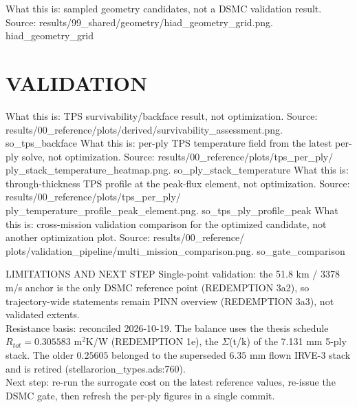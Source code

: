 \documentclass[aspectratio=169,11pt]{beamer}
\begin{document}
  {%
   What this is: sampled geometry candidates, not a DSMC validation result.
   Source: results/99\_shared/geometry/hiad\_geometry\_grid.png.}
  {hiad_geometry_grid}

\section{VALIDATION}
  {%
   What this is: TPS survivability/backface result, not optimization.
   Source: results/00\_reference/plots/derived/survivability\_assessment.png.}
  {so_tps_backface}
  {%
   What this is: per-ply TPS temperature field from the latest per-ply solve,
   not optimization. Source: results/00\_reference/plots/tps\_per\_ply/
   ply\_stack\_temperature\_heatmap.png.}
  {so_ply_stack_temperature}
  {%
   What this is: through-thickness TPS profile at the peak-flux element, not
   optimization. Source: results/00\_reference/plots/tps\_per\_ply/
   ply\_temperature\_profile\_peak\_element.png.}
  {so_tps_ply_profile_peak}
  {%
   What this is: cross-mission validation comparison for the optimized
   candidate, not another optimization plot. Source: results/00\_reference/
   plots/validation\_pipeline/multi\_mission\_comparison.png.}
  {so_gate_comparison}
\begin{frame}{LIMITATIONS AND NEXT STEP}
  \footnotesize
  Single-point validation: the 51.8 km / 3378 m/s anchor is the only DSMC
  reference point (REDEMPTION 3a2), so trajectory-wide statements remain PINN
  overview (REDEMPTION 3a3), not validated extents.\\
  Resistance basis: reconciled 2026-10-19. The balance uses the thesis
  schedule $R_{tot}=0.305583$ m$^2$K/W (REDEMPTION 1e), the $\Sigma$(t/k) of
  the 7.131 mm 5-ply stack. The older $0.25605$ belonged to the superseded
  $6.35$ mm flown IRVE-3 stack and is retired (stellarorion\_types.ads:760).\\
  Next step: re-run the surrogate cost on the latest reference values, re-issue
  the DSMC gate, then refresh the per-ply figures in a single commit.
\end{frame}
\end{document}
